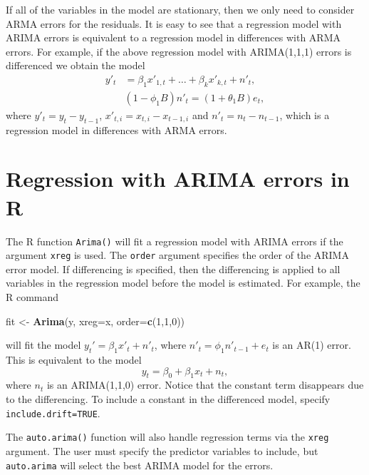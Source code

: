 \documentclass[]{book}
\newenvironment{Shaded}{\begin{snugshade}}{\end{snugshade}}
\newcommand{\DataTypeTok}[1]{\textcolor[rgb]{0.13,0.29,0.53}{#1}}
\newcommand{\DecValTok}[1]{\textcolor[rgb]{0.00,0.00,0.81}{#1}}
\newcommand{\KeywordTok}[1]{\textcolor[rgb]{0.13,0.29,0.53}{\textbf{#1}}}
\newcommand{\NormalTok}[1]{#1}
\newcommand{\StringTok}[1]{\textcolor[rgb]{0.31,0.60,0.02}{#1}}
\begin{document}
If all of the variables in the model are stationary, then we only need to consider ARMA errors for the residuals. It is easy to see that a regression model with ARIMA errors is equivalent to a regression model in differences with ARMA errors. For example, if the above regression model with ARIMA(1,1,1) errors is differenced we obtain the model
\begin{align*}
  y'_t &= \beta_1 x'_{1,t} + \dots + \beta_k x'_{k,t} + n'_t,\\
       & (1-\phi_1B)n'_t = (1+\theta_1B)e_t,
\end{align*}
where \(y'_t=y_t-y_{t-1}\), \(x'_{t,i}=x_{t,i}-x_{t-1,i}\) and \(n'_t=n_t-n_{t-1}\), which is a regression model in differences with ARMA errors.

\hypertarget{regression-with-arima-errors-in-r}{%
\section{Regression with ARIMA errors in R}\label{regression-with-arima-errors-in-r}}

The R function \texttt{Arima()} will fit a regression model with ARIMA errors if the argument \texttt{xreg} is used. The \texttt{order} argument specifies the order of the ARIMA error model. If differencing is specified, then the differencing is applied to all variables in the regression model before the model is estimated. For example, the R command

\begin{Shaded}
\begin{Highlighting}[]
\NormalTok{fit <-}\StringTok{ }\KeywordTok{Arima}\NormalTok{(y, }\DataTypeTok{xreg=}\NormalTok{x, }\DataTypeTok{order=}\KeywordTok{c}\NormalTok{(}\DecValTok{1}\NormalTok{,}\DecValTok{1}\NormalTok{,}\DecValTok{0}\NormalTok{))}
\end{Highlighting}
\end{Shaded}

will fit the model \(y_t' = \beta_1 x'_t + n'_t\), where \(n'_t = \phi_1 n'_{t-1} + e_t\) is an AR(1) error. This is equivalent to the model
\[
  y_t = \beta_0 + \beta_1 x_t + n_t,
\]
where \(n_t\) is an ARIMA(1,1,0) error. Notice that the constant term disappears
due to the differencing. To include a constant in the differenced
model, specify \texttt{include.drift=TRUE}.

The \texttt{auto.arima()} function will also handle regression terms via the \texttt{xreg} argument. The user must specify the predictor variables to include, but \texttt{auto.arima} will select the best ARIMA model for the errors.
\end{document}
